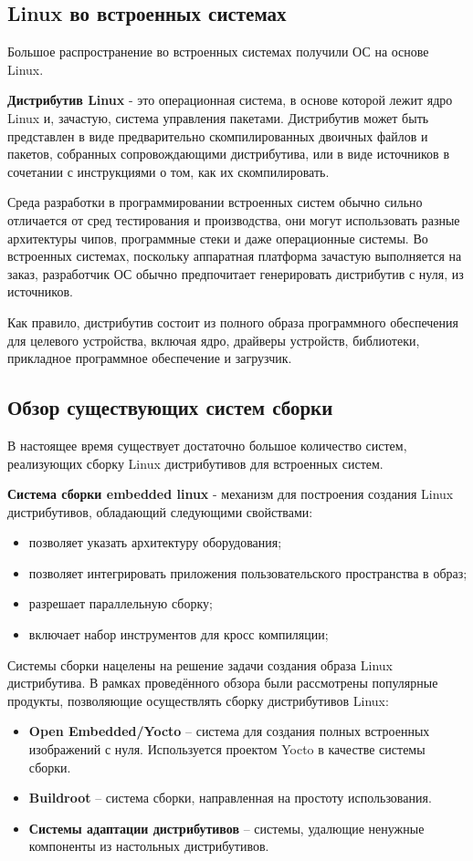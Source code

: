 \newpage
\subsection{Linux во встроенных системах}

Большое распространение во встроенных системах получили ОС на основе Linux.

\textbf{Дистрибутив Linux} - это операционная система, в основе которой лежит ядро Linux и, зачастую, система управления пакетами. 
Дистрибутив может быть представлен в виде предварительно скомпилированных двоичных файлов и пакетов, собранных сопровождающими дистрибутива, или в виде источников в сочетании с инструкциями о том, как их скомпилировать.

Среда разработки в программировании встроенных систем обычно сильно отличается от сред тестирования и производства, они могут использовать разные архитектуры чипов, программные стеки и даже операционные системы.
Во встроенных системах, поскольку аппаратная платформа зачастую выполняется на заказ, разработчик ОС обычно предпочитает генерировать дистрибутив с нуля, из источников.

Как правило, дистрибутив состоит из полного образа программного обеспечения для целевого устройства, включая ядро, драйверы устройств, библиотеки, прикладное программное обеспечение и загрузчик.


\newpage
\subsection{Обзор существующих систем сборки}
В настоящее время существует достаточно большое количество систем, реализующих сборку Linux дистрибутивов для встроенных систем.

\textbf{Система сборки embedded linux} - механизм для построения создания Linux дистрибутивов, обладающий следующими свойствами:
\begin{itemize}
  \item позволяет указать архитектуру оборудования;
  \item позволяет интегрировать приложения пользовательского пространства в образ;
  \item разрешает параллельную сборку;
  \item включает набор инструментов для кросс компиляции;
\end{itemize}

Системы сборки нацелены на решение задачи создания образа Linux дистрибутива. 
В рамках проведённого обзора были рассмотрены популярные продукты, позволяющие осуществлять сборку дистрибутивов Linux:
\begin{itemize}
  \item \textbf{Open Embedded/Yocto} -- система для создания полных встроенных изображений с нуля. Используется проектом Yocto в качестве системы сборки.
  \item \textbf{Buildroot} -- система сборки, направленная на простоту использования.
  \item \textbf{Системы адаптации дистрибутивов} -- системы, удалющие ненужные компоненты из настольных дистрибутивов.
\end{itemize}
\newpage

